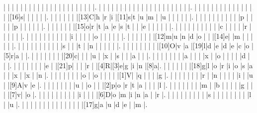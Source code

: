 \documentclass[12pt]{article}
\begin{document}
\begin{Puzzle}{22}{24}
  |{}  |{}  |{}  |{}  |{}  |{}  |{}  |{}  |{}  |{}  |{}  |{}  |{}  |{}  |{}  |{}  |{}  |{}  |{}  |{}  |{}  |.
  |{}  |{}  |{}  |{}  |{}  |{}  |{}  |{}  |{}  |{}  |{}  |{}  |{}  |{}  |{}  |{}  |{}  |{}  |{}  |{}  |{}  |.
  |{}  |{}  |{}  |{}  |{}  |{}  |{}  |{}  |{}  |{}  |{}  |{}  |{}  |{}  |{}  |[16]s|{}  |{}  |{}  |{}  |{}  |.
  |{}  |{}  |{}  |{}  |{}  |{}  |[13]C|h   |r   |i   |[11]s|t   |u   |m   |{}  |u   |{}  |{}  |{}  |{}  |{}  |.
  |{}  |{}  |{}  |{}  |{}  |{}  |{}  |{}  |{}  |{}  |p   |{}  |{}  |{}  |{}  |p   |{}  |{}  |{}  |{}  |{}  |.
  |{}  |{}  |{}  |{}  |{}  |{}  |[15]o|r   |t   |a   |e   |s   |t   |{}  |{}  |e   |{}  |{}  |{}  |{}  |{}  |.
  |{}  |{}  |{}  |{}  |{}  |{}  |{}  |{}  |{}  |{}  |c   |{}  |{}  |{}  |{}  |r   |{}  |{}  |{}  |{}  |{}  |.
  |{}  |{}  |{}  |{}  |{}  |{}  |{}  |{}  |{}  |{}  |i   |{}  |{}  |{}  |{}  |o   |{}  |{}  |{}  |{}  |{}  |.
  |{}  |{}  |{}  |{}  |{}  |{}  |[12]m|u   |n   |d   |o   |{}  |{}  |[14]e|{}  |m   |{}  |{}  |{}  |{}  |{}  |.
  |{}  |{}  |{}  |{}  |{}  |{}  |{}  |{}  |{}  |{}  |s   |{}  |{}  |t   |{}  |n   |{}  |{}  |{}  |{}  |{}  |.
  |{}  |{}  |{}  |{}  |{}  |{}  |{}  |{}  |[10]O|v   |a   |[19]l|d   |e   |d   |e   |c   |o   |[5]r|a   |{}  |.
  |{}  |{}  |{}  |{}  |{}  |{}  |{}  |[20]c|{}  |{}  |{}  |u   |{}  |x   |{}  |s   |{}  |{}  |a   |{}  |{}  |.
  |{}  |{}  |{}  |{}  |{}  |{}  |{}  |a   |{}  |{}  |{}  |x   |{}  |o   |{}  |{}  |{}  |{}  |d   |{}  |{}  |.
  |{}  |{}  |{}  |{}  |{}  |{}  |{}  |e   |{}  |[21]p|{}  |{}  |{}  |r   |{}  |[4]R|[3]e|g   |i   |n   |[8]a|.
  |{}  |{}  |{}  |{}  |{}  |{}  |[18]g|l   |o   |r   |i   |o   |s   |a   |{}  |{}  |x   |{}  |x   |{}  |n   |.
  |{}  |{}  |{}  |{}  |{}  |{}  |{}  |o   |{}  |o   |{}  |{}  |{}  |{}  |[1]V|{}  |q   |{}  |{}  |{}  |g   |.
  |{}  |{}  |{}  |{}  |{}  |{}  |{}  |r   |{}  |n   |{}  |{}  |{}  |{}  |i   |{}  |u   |{}  |[9]A|v   |e   |.
  |{}  |{}  |{}  |{}  |{}  |{}  |{}  |u   |{}  |o   |{}  |{}  |[2]p|o   |r   |t   |a   |{}  |{}  |{}  |l   |.
  |{}  |{}  |{}  |{}  |{}  |{}  |{}  |m   |{}  |b   |{}  |{}  |{}  |{}  |g   |{}  |{}  |{}  |[7]v|{}  |o   |.
  |{}  |{}  |{}  |{}  |{}  |{}  |{}  |{}  |{}  |i   |{}  |{}  |{}  |[6]D|o   |m   |i   |n   |a   |{}  |r   |.
  |{}  |{}  |{}  |{}  |{}  |{}  |{}  |{}  |{}  |s   |{}  |{}  |{}  |{}  |{}  |{}  |{}  |{}  |l   |{}  |u   |.
  |{}  |{}  |{}  |{}  |{}  |{}  |{}  |{}  |{}  |{}  |{}  |{}  |{}  |{}  |[17]g|a   |u   |d   |e   |{}  |m   |.
\end{Puzzle}
\end{document}
